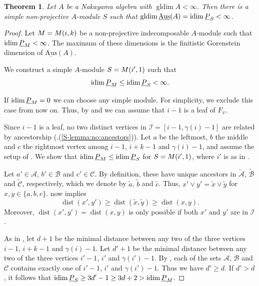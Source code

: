 \documentclass[a4paper]{amsart}
\newtheorem{theorem}{Theorem}[section]
\theoremstyle{definition}
\theoremstyle{remark}
\numberwithin{equation}{theorem}
\newcommand{\sAus}{\operatorname{\underline{Aus}}}
\newcommand{\gldim}{\operatorname{gldim}}
\newcommand{\dist}{\operatorname{dist}}
\newcommand{\psiforest}{F_\psi}
\begin{document}
\begin{theorem}\label{theorem:simples}
    Let $A$ be a Nakayama algebra with $\gldim A < \infty$.  Then there is a simple non-projective $A$-module $S$ such that $\gldim \sAus(A)= \stabidim[S] < \infty $.
\end{theorem}
\begin{proof}
    Let $M=\mik$ be a non-projective indecomposable $A$-module such that $\stabidim < \infty$.
    The maximum of these dimensions is the finitistic Gorenstein dimension of $\sAus (A)$.

    We construct a simple $A$-module $S=\mik[i'][1]$ such that
    \[
    \stabidim\leq\stabidim[S] < \infty .
    \]

    If $\stabidim=0$ we can choose any simple module.  For
    simplicity, we exclude this case from now on.  Thus, by  and  we can assume that $i-1$ is a leaf of $\psiforest$.

    Since $i-1$ is a leaf, no two distinct vertices in $\mathcal I=[i-1,\gamma(i)-1]$ are related by ancestorship (.(\ref{S-lemma:no:ancestors})).
    Let $a$ be the leftmost, $b$ the middle and $c$ the rightmost vertex among $i-1$, $i+k-1$ and $\gamma(i)-1$, and assume the setup of . We show that $\stabidim\leq\stabidim[S]$ for $S=\mik[i'][1]$, where $i'$ is as in .

    Let $a'\in\mathcal A$,
    $b'\in\mathcal B$ and $c'\in\mathcal C$.  By
    definition, these have unique
    ancestors in $\tilde{\mathcal A}$, $\tilde{\mathcal B}$ and
    $\tilde{\mathcal C}$, respectively, which we denote by
    $ \tilde a $, $ \tilde b $ and $ \tilde c $.  Thus, $ x' \vee y' = \tilde x \vee \tilde y $ for $x, y \in \{a, b, c\}$.   now implies
    \[
      \dist(x', y') \geq \dist (\tilde x, \tilde y) \geq \dist(x, y).
    \]
    Moreover,
    $\dist(x', y')=\dist(x, y)$ is only possible if both $x'$ and
    $y'$ are in $\mathcal I$.

    As in , let $d+1$ be the minimal
    distance between any two of the three vertices $i-1$, $i+k-1$ and
    $\gamma(i)-1$.  Let $d'+1$ be the minimal distance between any
    two of the three vertices $i'-1$, $i'$ and $\gamma(i')-1$.  By ,
    each of the sets $\mathcal A$, $\mathcal B$ and $\mathcal C$
    contains exactly one of $i'-1$, $i'$ and $\gamma(i')-1$.  Thus we
    have $d'\geq d$.  If $d'> d$, it follows that
    $\stabidim[S]\geq 3d'-1\geq 3d+2>\stabidim$.


\end{proof}
\end{document}
